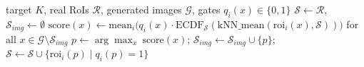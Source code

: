 \documentclass[Japanese]{dicomopapers}
\begin{document}
\begin{algorithm}[H]
\caption{Sequential Selection (QN with Quality Gate)}
\begin{algorithmic}[1]
\Require target $K$, real RoIs $\mathcal{R}$, generated images $\mathcal{G}$, gates $q_i(x)\in\{0,1\}$
\State $\mathcal{S}\gets \mathcal{R}$, \ $\mathcal{S}_{img}\gets \emptyset$
  \State $\text{score}(x)\gets \mathrm{mean}_i\big(q_i(x)\cdot \mathrm{ECDF}_{\mathcal{S}}(\mathrm{kNN\_mean}(\mathrm{roi}_i(x),\mathcal{S}))\big)$ for all $x\in\mathcal{G}\setminus\mathcal{S}_{img}$
  \State $p\gets \arg\max_{x}\ \text{score}(x)$; \quad $\mathcal{S}_{img}\gets \mathcal{S}_{img}\cup\{p\}$; \quad $\mathcal{S}\gets \mathcal{S}\cup\{\mathrm{roi}_i(p)\mid q_i(p)=1\}$
\EndWhile
\end{algorithmic}
\end{algorithm}



\end{document}
